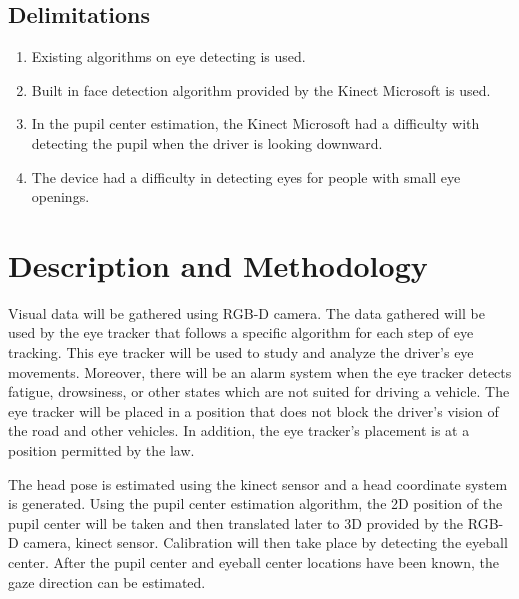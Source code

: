 \subsection{Delimitations}
\begin{enumerate}
	
	\item Existing algorithms on eye detecting is used.
	
	\item Built in face detection algorithm provided by the Kinect Microsoft is used.
	
	\item In the pupil center estimation, the Kinect Microsoft had a difficulty with detecting the pupil when the driver is looking downward.
	
	\item The device had a difficulty in detecting eyes for people with small eye openings.
		
\end{enumerate}

\section{Description and Methodology}

Visual data will be gathered using RGB-D camera. The data gathered will be used by the eye tracker that follows a specific algorithm for each step of eye tracking. This eye tracker will be used to study and analyze the driver’s eye movements. Moreover, there will be an alarm system when the eye tracker detects fatigue, drowsiness, or other states which are not suited for driving a vehicle. The eye tracker will be placed in a position that does not block the driver’s vision of the road and other vehicles. In addition, the eye tracker’s placement is at a position permitted by the law.

The head pose is estimated using the kinect sensor and a head coordinate system is generated. Using the pupil center estimation algorithm, the 2D position of the pupil center will be taken and then translated later to 3D provided by the RGB-D camera, kinect sensor. Calibration will then take place by detecting the eyeball center. After the pupil center and eyeball center locations have been known, the gaze direction can be estimated.

